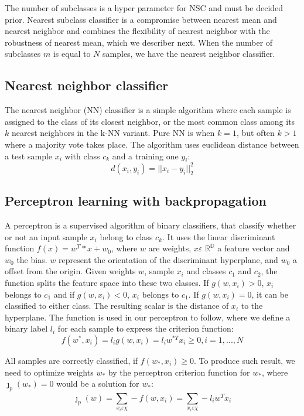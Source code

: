 \documentclass[journal]{IEEEtran}
\begin{document}
The number of subclasses is a hyper parameter for NSC and must be decided prior. Nearest subclass classifier is a compromise between nearest mean and nearest neighbor and combines the flexibility of nearest neighbor with the robustness of nearest mean, which we describer next. When the number of subclasses $m$ is equal to $N$ samples, we have the nearest neighbor classifier.

\subsection{Nearest neighbor classifier}

The nearest neighbor (NN) classifier is a simple algorithm where each sample is assigned to the class of its closest neighbor, or the most common class among its $k$ nearest neighbors in the k-NN variant. Pure NN is when $k=1$, but often $k>1$ where a majority vote takes place. The algorithm uses euclidean distance between a test sample $x_{i}$ with class $c_{k}$ and a training one $y_{i}$: $$ d(x_{i},y_{i}) = ||x_{i}-y_{i}||^2_{2} $$

\subsection{Perceptron learning with backpropagation}

A perceptron is a supervised algorithm of binary classifiers, that classify whether or not an input sample $x_{i}$ belong to class $c_{k}$. It uses the linear discriminant function $f(x) = w^T*x + w_{0}$, where $w$ are weights, $x\varepsilon$ $\mathbb{R^D}$ a feature vector and $w_{0}$ the bias. $w$ represent the orientation of the discriminant hyperplane, and $w_{0}$ a offset from the origin. Given weights $w$, sample $x_{i}$ and classes $c_{1}$ and $c_{2}$, the function splits the feature space into these two classes. If $g(w,x_{i}) > 0$, $x_{i}$ belongs to $c_{1}$ and if $g(w,x_{i}) < 0$, $x_{i}$ belongs to $c_{1}$. If $g(w,x_{i}) = 0$, it can be classified to either class. The resulting scalar is the distance of $x_{i}$ to the hyperplane. The function is used in our perceptron to follow, where we define a binary label $l_{i}$ for each sample to express the criterion function: $$ f(w^*,x_{i}) = l_{i} g(w,x_{i}) = l_{i} w^{*T} x_{i} \geq 0, i = 1, ..., N $$

All samples are correctly classified, if $f(w_{*}, x_{i}) \geq 0$. To produce such result, we need to optimize weights $w_{*}$ by the perceptron criterion function for $w_{*}$, where ${\jmath}_{p}(w_{*}) = 0$ would be a solution for $w_{*}$: $$ {\jmath}_{p}(w) = \sum_{x_{i} \varepsilon \chi}^{} -f(w,x_{i}) = \sum_{x_{i} \varepsilon \chi}^{} -l_{i} w^T x_{i} $$
\end{document}

